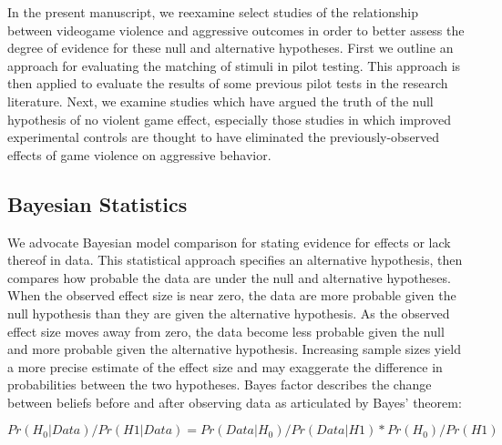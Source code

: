 \documentclass[fignum,nobf,man]{apa}
\begin{document}
In the present manuscript, we reexamine select studies of the relationship between videogame violence and aggressive outcomes in order to better assess the degree of evidence for these null and alternative hypotheses. First we outline an approach for evaluating the matching of stimuli in pilot testing. This approach is then applied to evaluate the results of some previous pilot tests in the research literature. Next, we examine studies which have argued the truth of the null hypothesis of no violent game effect, especially those studies in which improved experimental controls are thought to have eliminated the previously-observed effects of game violence on aggressive behavior. 

\subsection{Bayesian Statistics }
We advocate Bayesian model comparison for stating evidence for effects or lack thereof in data. %
This statistical approach specifies an alternative hypothesis, then compares how probable the data are under the null and alternative hypotheses. When the observed effect size is near zero, the data are more probable given the null hypothesis than they are given the alternative hypothesis. As the observed effect size moves away from zero, the data become less probable given the null and more probable given the alternative hypothesis.  Increasing sample sizes yield a more precise estimate of the effect size and may exaggerate the difference in probabilities between the two hypotheses. Bayes factor describes the change between beliefs before and after observing data as articulated by Bayes’ theorem:

\begin{equation}
Pr(H_0 | Data) / Pr(H1 | Data) = Pr(Data | H_0) / Pr(Data | H1) * Pr(H_0) / Pr (H1) 
\end{equation}
\end{document}
